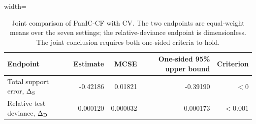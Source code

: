 \begin{table}[H]
\centering
\caption{Joint comparison of PanIC-CF with CV. The two endpoints are equal-weight means over the seven settings; the relative-deviance endpoint is dimensionless. The joint conclusion requires both one-sided criteria to hold.}
\label{Table: confirmatory decision}
\begin{adjustbox}{width=\textwidth}
\begin{tabular}{lrrrr}
\hline
Endpoint & Estimate & MCSE & One-sided 95\% upper bound & Criterion \\
\hline
Total support error, $\Delta_{\rm S}$ & -0.42186 & 0.01821 & -0.39190 & $<0$ \\
Relative test deviance, $\Delta_{\rm D}$ & 0.000120 & 0.000032 & 0.000173 & $<0.001$ \\
\hline
\end{tabular}
\end{adjustbox}
\end{table}
